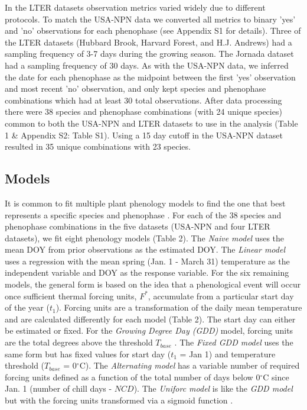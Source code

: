 \documentclass[fleqn,12pt,lineno]{article}
\begin{document}
In the LTER datasets observation metrics varied widely due to different protocols. To match the USA-NPN data we converted all metrics to binary 'yes' and 'no' observations for each phenophase (see Appendix S1 for details). Three of the LTER datasets (Hubbard Brook, Harvard Forest, and H.J. Andrews) had a sampling frequency of 3-7 days during the growing season. The Jornada dataset had a sampling frequency of 30 days. As with the USA-NPN data, we inferred the date for each phenophase as the midpoint between the first 'yes' observation and most recent 'no' observation, and only kept species and phenophase combinations which had at least 30 total observations. After data processing there were 38 species and phenophase combinations (with 24 unique species) common to both the USA-NPN and LTER datasets to use in the analysis (Table 1 \& Appendix S2: Table S1). Using a 15 day cutoff in the USA-NPN dataset resulted in 35 unique combinations with 23 species.

\subsection*{Models}

It is common to fit multiple plant phenology models to find the one that best represents a specific species and phenophase \citep{chuine2013}. For each of the 38 species and phenophase combinations in the five datasets (USA-NPN and four LTER datasets), we fit eight phenology models (Table 2). The \textit{Naive model} uses the mean DOY from prior observations as the estimated DOY. The \textit{Linear model} uses a regression with the mean spring (Jan. 1 - March 31) temperature as the independent variable and DOY as the response variable. For the six remaining models, the general form is based on the idea that a phenological event will occur once sufficient thermal forcing units, $F^{*}$, accumulate from a particular start day of the year ($t_{1}$). Forcing units are a transformation of the daily mean temperature and are calculated differently for each model (Table 2). The start day can either be estimated or fixed. For the \textit{Growing Degree Day (GDD)} model, forcing units are the total degrees above the threshold $T_{base}$ \citep{reaumur1735, wang1960, hunter1992}. The \textit{Fixed GDD model} uses the same form but has fixed values for start day ($t_{1}$ = Jan 1) and temperature threshold ($T_{base}$ = 0$^{\circ}$C). The \textit{Alternating model} has a variable number of required forcing units defined as a function of the total number of days below 0$^{\circ}$C since Jan. 1 (number of chill days - $NCD$). The \textit{Uniforc model} is like the \textit{GDD model} but with the forcing units transformed via a sigmoid function \citep{chuine2000}. 
\end{document}
